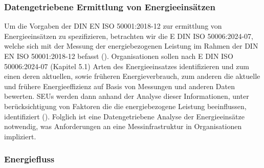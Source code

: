 \subsubsection{Datengetriebene Ermittlung von Energieeinsätzen}
Um die Vorgaben der DIN EN ISO 50001:2018-12 zur ermittlung von Energieeinsätzen zu spezifizieren, betrachten wir die E DIN ISO 50006:2024-07,
welche sich mit der Messung der energiebezogenen Leistung im Rahmen der DIN EN ISO 50001:2018-12 befasst (\cite[S. 1]{DIN50006.2024}).
Organisationen sollen nach E DIN ISO 50006:2024-07 (Kapitel 5.1) Arten des Energieeinsatzes identifizieren und zum einen deren aktuellen, sowie früheren 
Energieverbrauch, zum anderen die aktuelle und frühere Energieeffizienz auf Basis von Messungen und anderen Daten bewerten. 
SEUs werden dann anhand der Analyse dieser Informationen, unter berücksichtigung von Faktoren die die energiebezogene Leistung beeinflussen, 
identifiziert (\cite[Kapitel 5.1]{DIN50006.2024}). 
Folglich ist eine Datengetriebene Analyse der Energieeinsätze notwendig, was Anforderungen an eine Messinfrastruktur in Organisationen impliziert.

\subsubsection{Energiefluss}
